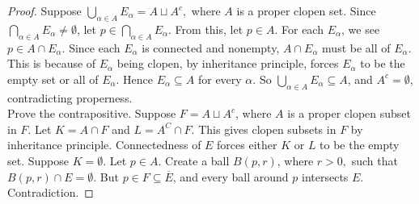 \documentclass[12pt]{amsart}
\theoremstyle{plain}
\theoremstyle{definition}
\theoremstyle{remark}
\begin{document}
\begin{proof}
    Suppose $\bigcup_{\alpha \in A} E_\alpha = A \sqcup A^c,$ where $A$ is a proper clopen set. Since $\bigcap_{\alpha \in A} E_\alpha \neq \emptyset$, let $p \in \bigcap_{\alpha \in A} E_\alpha$. From this, let $p \in A$. For each $E_\alpha$, we see $p \in A \cap E_\alpha$. Since each $E_\alpha$ is connected and nonempty, $A \cap E_\alpha$ must be all of $E_\alpha$. This is because of $E_\alpha$ being clopen, by inheritance principle, forces $E_\alpha$ to be the empty set or all of $E_\alpha$. Hence $E_\alpha \subseteq A$ for every $\alpha$. So $\bigcup_{\alpha \in A} E_\alpha \subseteq A$, and $A^c = \emptyset$, contradicting properness. 
\\
Prove the contrapositive. Suppose $F = A \sqcup A^c$, where $A$ is a proper clopen subset in $F$. Let $K = A \cap F$ and $L = A^C \cap F$. This gives clopen subsets in $F$ by inheritance principle. Connectedness of $E$ forces either $K$ or $L$ to be the empty set. Suppose $K = \emptyset$. Let $p \in A$. Create a ball $B(p,r)$, where $r > 0,$ such that $B(p,r) \cap E = \emptyset$. But $p \in F \subseteq \overline{E}$, and every ball around $p$ intersects $E$. Contradiction. 
\end{proof}
\end{document}
